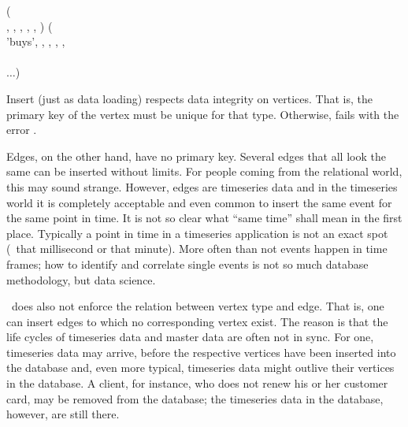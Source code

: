 \begin{minipage}{\textwidth}
  ( \\
                      ,
                      ,
                      ,
                      ,
                      ,
                      ) (\\
\hspace*{0.2cm} 'buys', , 
                         ,
                         ,
                         ,
                          \\
\hspace*{0.35cm}  \\
\hspace*{0.2cm} $\dots$)
\end{minipage}

Insert (just as data loading) respects data integrity
on vertices. That is, the primary key of the vertex
must be unique for that type. Otherwise, 
fails with the error .

Edges, on the other hand, have no primary key.
Several edges that all look the same can be inserted
without limits. For people coming from the relational
world, this may sound strange. However, edges are
timeseries data and in the timeseries world
it is completely acceptable and
even common to insert the same event for the same
point in time. It is not so clear 
what ``same time'' shall mean in the first place.
Typically a point in time in a timeseries application
is not an exact spot (\eg\ that millisecond or that
minute). More often than not events happen in
time frames; how to identify and correlate single events
is not so much database methodology, but data science.

\nowdb\ does also not enforce the relation between
vertex type and edge. That is, one can insert edges
to which no corresponding vertex exist.
The reason is that the life cycles of timeseries data
and master data are often not in sync.
For one, timeseries data may arrive, before the
respective vertices have been inserted into the database
and, even more typical, timeseries data might
outlive their vertices in the database.
A client, for instance, who does not renew his or her
customer card, may be removed from the database;
the timeseries data in the database, however,
are still there.

